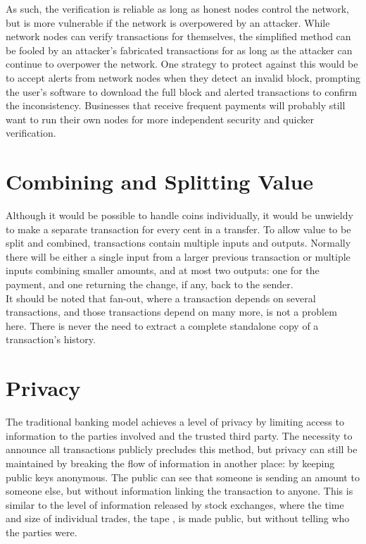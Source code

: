 \documentclass{article}
\begin{document}


As such, the verification is reliable as long as honest nodes control the network,
but is more vulnerable if the network is overpowered by an attacker.
While network nodes can verify transactions for themselves,
the simplified method can be fooled by an attacker's fabricated transactions for as long as the attacker can continue to
overpower the network.
One strategy to protect against this would be to accept alerts from network nodes when they detect an invalid block,
prompting the user's software to download the full block and alerted transactions to confirm the inconsistency.
Businesses that receive frequent payments will probably still want to run their own nodes for more independent security
and quicker verification.

\section{Combining and Splitting Value}\label{sec:combining-and-splitting-value}
Although it would be possible to handle coins individually, it would be unwieldy to make a separate transaction for
every cent in a transfer.
To allow value to be split and combined,
transactions contain multiple inputs and outputs.
Normally there will be either a single input from a larger previous transaction or multiple inputs combining smaller
amounts, and at most two outputs:
one for the payment, and one returning the change, if any, back to the sender.\\



It should be noted that fan-out, where a transaction depends on several transactions,
and those transactions depend on many more, is not a problem here.
There is never the need to extract a complete standalone copy of a transaction's history.

\section{Privacy}\label{sec:privacy}
The traditional banking model achieves a level of privacy by limiting access to information to the
parties involved and the trusted third party.
The necessity to announce all transactions publicly precludes this method,
but privacy can still be maintained by breaking the flow of information in another place:
by keeping public keys anonymous.
The public can see that someone is sending an amount to someone else,
but without information linking the transaction to anyone.
This is similar to the level of information released by stock exchanges,
where the time and size of individual trades, the \textquotedbl tape \textquotedbl, is made public,
but without telling who the parties were.\\
\end{document}
